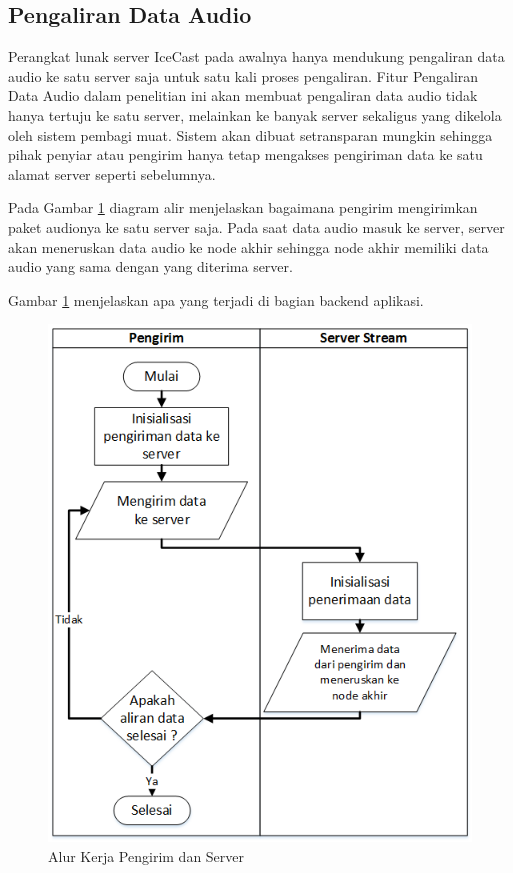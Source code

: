 \subsection{Pengaliran Data Audio}

Perangkat lunak server IceCast pada awalnya hanya mendukung pengaliran data audio ke satu server saja untuk satu kali proses pengaliran. Fitur Pengaliran Data Audio dalam penelitian ini akan membuat pengaliran data audio tidak hanya tertuju ke satu server, melainkan ke banyak server sekaligus yang dikelola oleh sistem pembagi muat. Sistem akan dibuat setransparan mungkin sehingga pihak penyiar atau pengirim hanya tetap mengakses pengiriman data ke satu alamat server seperti sebelumnya.

Pada Gambar \ref{fig:kirim-server} diagram alir menjelaskan bagaimana pengirim mengirimkan paket audionya ke satu server saja. Pada saat data audio masuk ke server, server akan meneruskan data audio ke node akhir sehingga node akhir memiliki data audio yang sama dengan yang diterima server.

Gambar \ref{fig:kirim-server} menjelaskan apa yang terjadi di bagian backend aplikasi.

\begin{figure}[h]
    \centering
    \includegraphics[width=1\linewidth]{kirim-server}
    \caption{Alur Kerja Pengirim dan Server}
    \label{fig:kirim-server}
\end{figure}


